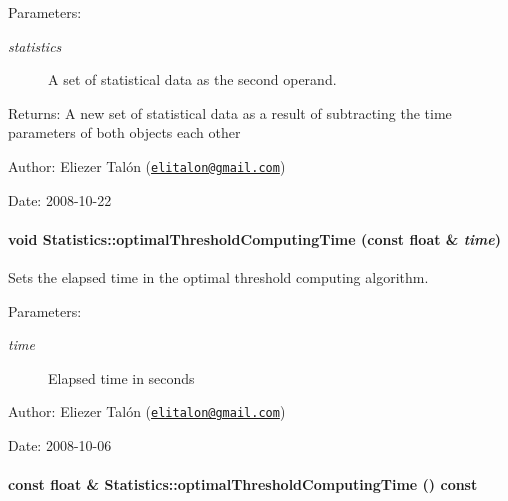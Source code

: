 \begin{Desc}
\item[Parameters:]
\begin{description}
\item[{\em statistics}]A set of statistical data as the second operand.\end{description}
\end{Desc}
\begin{Desc}
\item[Returns:]A new set of statistical data as a result of subtracting the time parameters of both objects each other\end{Desc}
\begin{Desc}
\item[Author:]Eliezer Talón (\href{mailto:elitalon@gmail.com}{\tt elitalon@gmail.com}) \end{Desc}
\begin{Desc}
\item[Date:]2008-10-22 \end{Desc}
\hypertarget{class_statistics_90380f820c043813aafb85c1dc9a6393}{
\paragraph[{optimalThresholdComputingTime}]{\setlength{\rightskip}{0pt plus 5cm}void Statistics::optimalThresholdComputingTime (const float \& {\em time})}\hfill}
\label{class_statistics_90380f820c043813aafb85c1dc9a6393}


Sets the elapsed time in the optimal threshold computing algorithm. 

\begin{Desc}
\item[Parameters:]
\begin{description}
\item[{\em time}]Elapsed time in seconds\end{description}
\end{Desc}
\begin{Desc}
\item[Author:]Eliezer Talón (\href{mailto:elitalon@gmail.com}{\tt elitalon@gmail.com}) \end{Desc}
\begin{Desc}
\item[Date:]2008-10-06 \end{Desc}
\hypertarget{class_statistics_3a364709b9fe8dbefd03b3bb45d9a89d}{
\paragraph[{optimalThresholdComputingTime}]{\setlength{\rightskip}{0pt plus 5cm}const float \& Statistics::optimalThresholdComputingTime () const}\hfill}
\label{class_statistics_3a364709b9fe8dbefd03b3bb45d9a89d}


